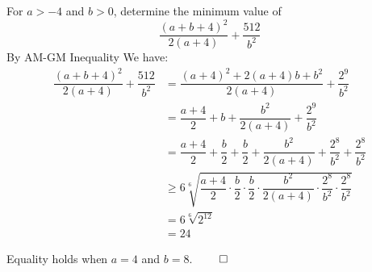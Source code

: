 \documentclass{article}
\begin{document}
	For $a > -4$ and $b > 0$, determine the minimum value of $$\frac{(a+b+4)^2}{2(a+4)}+\frac{512}{b^2}$$
	\newpage
	By AM-GM Inequality We have:
	\begin{align*}
		\dfrac{(a+b+4)^2}{2(a+4)}+\dfrac{512}{b^2} 
		&= \dfrac{(a+4)^2+2(a+4)b+b^2}{2(a+4)}+\dfrac{2^{9}}{b^2}\\[5pt] &=\dfrac{a+4}{2}+b+\dfrac{b^2}{2(a+4)}+\dfrac{2^{9}}{b^2}\\[5pt] &=\dfrac{a+4}{2}+\dfrac{b}{2}+\dfrac{b}{2}+\dfrac{b^2}{2(a+4)}+\dfrac{2^{8}}{b^2}+\dfrac{2^{8}}{b^2}\\[5pt] &\ge 6\sqrt[6]{\dfrac{a+4}{2} \cdot \dfrac{b}{2} \cdot \dfrac{b}{2} \cdot \dfrac{b^2}{2(a+4)} \cdot \dfrac{2^{8}}{b^2} \cdot \dfrac{2^{8}}{b^2}}\\ &=6\sqrt[6]{2^{12}}\\ &= 24
	\end{align*}

Equality holds when $a=4$ and $b=8$. $\qed$

	
	
\end{document}
